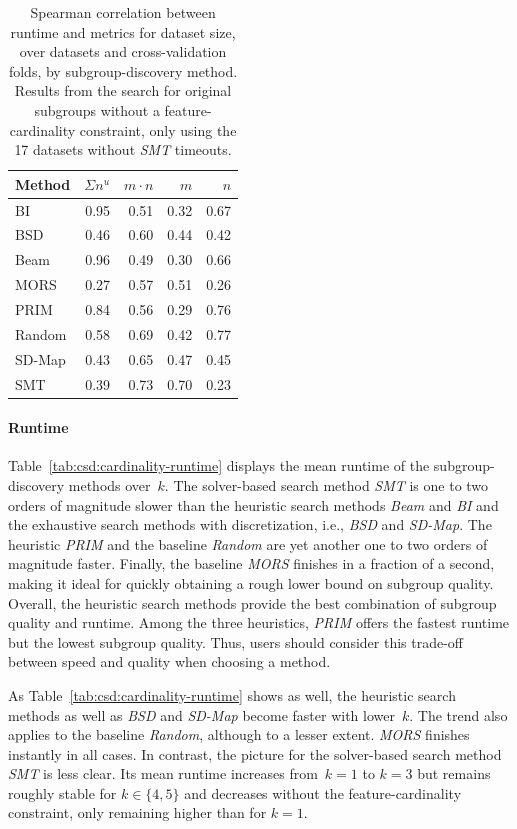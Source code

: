 \documentclass[acmsmall]{acmart} %
\theoremstyle{acmplain}
\theoremstyle{acmdefinition}
\begin{document}
\begin{table}[t]
	\centering
	\caption{
		Spearman correlation between runtime and metrics for dataset size,
		over datasets and cross-validation folds, by subgroup-discovery method.
		Results from the search for original subgroups without a feature-cardinality constraint, only using the 17 datasets without \emph{SMT} timeouts.
	}
	\begin{tabular}{lrrrr}
		\toprule
		Method & $\Sigma n^u$ & $m \cdot n$ & $m$ & $n$ \\
		\midrule
		BI & 0.95 & 0.51 & 0.32 & 0.67 \\
		BSD & 0.46 & 0.60 & 0.44 & 0.42 \\
		Beam & 0.96 & 0.49 & 0.30 & 0.66 \\
		MORS & 0.27 & 0.57 & 0.51 & 0.26 \\
		PRIM & 0.84 & 0.56 & 0.29 & 0.76 \\
		Random & 0.58 & 0.69 & 0.42 & 0.77 \\
		SD-Map & 0.43 & 0.65 & 0.47 & 0.45 \\
		SMT & 0.39 & 0.73 & 0.70 & 0.23 \\
		\bottomrule
	\end{tabular}
	\label{tab:csd:unconstrained-runtime-correlation}
\end{table}

\paragraph{Runtime}

Table~\ref{tab:csd:cardinality-runtime} displays the mean runtime of the subgroup-discovery methods over~$k$.
The solver-based search method \emph{SMT} is one to two orders of magnitude slower than the heuristic search methods \emph{Beam} and \emph{BI} and the exhaustive search methods with discretization, i.e., \emph{BSD} and \emph{SD-Map}.
The heuristic \emph{PRIM} and the baseline \emph{Random} are yet another one to two orders of magnitude faster.
Finally, the baseline \emph{MORS} finishes in a fraction of a second, making it ideal for quickly obtaining a rough lower bound on subgroup quality. 
Overall, the heuristic search methods provide the best combination of subgroup quality and runtime. 
Among the three heuristics, \emph{PRIM} offers the fastest runtime but the lowest subgroup quality.
Thus, users should consider this trade-off between speed and quality when choosing a method.

As Table~\ref{tab:csd:cardinality-runtime} shows as well, the heuristic search methods as well as \emph{BSD} and \emph{SD-Map} become faster with lower~$k$.
The trend also applies to the baseline \emph{Random}, although to a lesser extent. 
\emph{MORS} finishes instantly in all cases.
In contrast, the picture for the solver-based search method \emph{SMT} is less clear.
Its mean runtime increases from~$k=1$ to $k=3$ but remains roughly stable for $k \in \{4, 5\}$ and decreases without the feature-cardinality constraint, only remaining higher than for $k = 1$.
\end{document}
